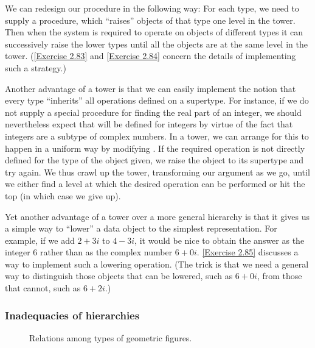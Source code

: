 We can redesign our  procedure in the following way:
For each type, we need to supply a  procedure, which “raises” objects of that type one level in the tower.
Then when the system is required to operate on objects of different types it can successively raise the lower types until all the objects are at the same level in the tower.
(\cref{Exercise 2.83} and \cref{Exercise 2.84} concern the details of implementing such a strategy.)

Another advantage of a tower is that we can easily implement the notion that every type “inherits” all operations defined on a supertype.
For instance, if we do not supply a special procedure for finding the real part of an integer, we should nevertheless expect that  will be defined for integers by virtue of the fact that integers are a subtype of complex numbers.
In a tower, we can arrange for this to happen in a uniform way by modifying .
If the required operation is not directly defined for the type of the object given, we raise the object to its supertype and try again.
We thus crawl up the tower, transforming our argument as we go, until we either find a level at which the desired operation can be performed or hit the top (in which case we give up).

Yet another advantage of a tower over a more general hierarchy is that it gives us a simple way to “lower” a data object to the simplest representation.
For example, if we add \( 2 + 3i \) to \( 4 - 3i \), it would be nice to obtain the answer as the integer 6 rather than as the complex number \( 6 + 0i \).
\cref{Exercise 2.85} discusses a way to implement such a lowering operation.
(The trick is that we need a general way to distinguish those objects that can be lowered, such as \( 6 + 0i \), from those that cannot, such as \( 6 + 2i \).)



\subsubsection*{Inadequacies of hierarchies}

\begin{figure}[tb]
	\centering
	
	\caption{Relations among types of geometric figures.}
	\label{Figure 2.26}
\end{figure}

